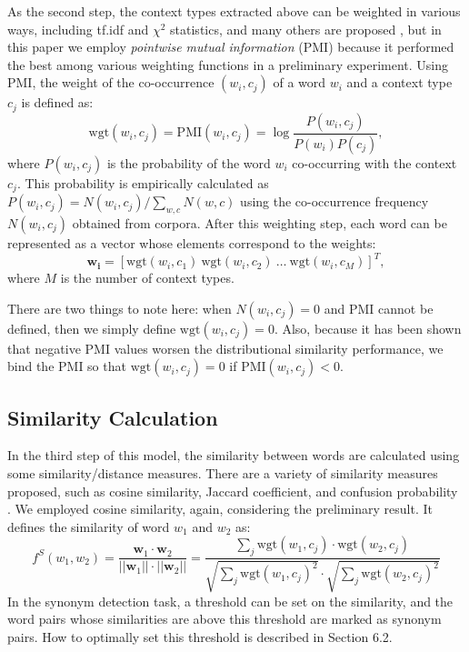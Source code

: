 \documentclass[english]{jnlp_1.4}
\begin{document}
As the second step, the context types extracted above can be weighted
in various ways, including tf.idf and $\chi^2$ statistics, and many
others are proposed \cite{Curran:02:improvements,Weeds:04}, but in
this paper we employ \textit{pointwise mutual information} (PMI) because
it performed the best among various weighting functions in a
preliminary experiment. Using PMI, the weight of the co-occurrence
$(w_i, c_j)$ of a word $w_i$ and a context type $c_j$ is defined as:
\begin{equation}
  \mathrm{wgt}(w_i, c_j) = \mathrm{PMI}(w_i, c_j) = \log\frac{P(w_i, c_j)}{P(w_i)P(c_j)}, \label{eq-pmi}
\end{equation}
where $P(w_i, c_j)$ is the probability of the word $w_i$ co-occurring
with the context $c_j$. This probability is empirically calculated as
$P(w_i, c_j) = N(w_i, c_j)/\sum_{w,c}N(w,c)$ using the co-occurrence
frequency $N(w_i, c_j)$ obtained from corpora. After this weighting
step, each word can be represented as a vector whose elements
correspond to the weights:
\begin{equation}
  \mathbf{w}_{\mathbf{i}} = [\mathrm{wgt}(w_i, c_1)\ \mathrm{wgt}(w_i, c_2)\ \dots\ \mathrm{wgt}(w_i, c_M)]^T,
\end{equation}
where $M$ is the number of context types.

There are two things to note here: when $N(w_i, c_j) = 0$ and PMI
cannot be defined, then we simply define $\mathrm{wgt}(w_i, c_j) =
0$. Also, because it has been shown \cite{Curran:02:improvements} that
negative PMI values worsen the distributional similarity performance,
we bind the PMI so that $\mathrm{wgt}(w_i, c_j) = 0$ if $\mathrm{PMI}(w_i,
c_j) < 0$.


\subsection{Similarity Calculation}

In the third step of this model, the similarity between words are
calculated using some similarity/distance measures. There are a
variety of similarity measures proposed, such as cosine similarity,
Jaccard coefficient, and confusion probability
\cite{Curran:02:improvements,Weeds:04}. We employed
cosine similarity, again, considering the preliminary result. It
defines the similarity of word $w_1$ and $w_2$ as:
\begin{equation}
f^S(w_1, w_2) = \frac{\mathbf{w}_1 \cdot \mathbf{w}_2}{||\mathbf{w}_1||\cdot ||\mathbf{w}_2||} = \frac{\sum_j \mathrm{wgt}(w_1, c_j) \cdot \mathrm{wgt}(w_2, c_j)}{\sqrt{\sum_j \mathrm{wgt}(w_1, c_j)^2} \cdot \sqrt{\sum_j \mathrm{wgt}(w_2, c_j)^2}} \label{eq-cosine}
\end{equation}
In the synonym detection task, a threshold can be set on the
similarity, and the word pairs whose similarities are above this
threshold are marked as synonym pairs. How to optimally set this
threshold is described in Section 6.2.
\end{document}

